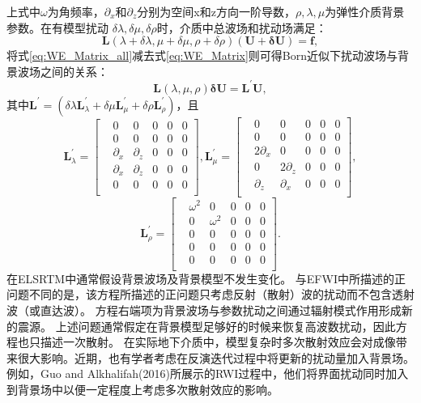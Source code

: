 上式中$\omega$为角频率，$\partial_x$和$\partial_z$分别为空间x和z方向一阶导数，$\rho,\lambda,\mu$为弹性介质背景参数。在有模型扰动
$\delta\lambda,\delta\mu,\delta\rho$时，介质中总波场和扰动场满足：
\begin{equation}
\mathbf{L}(\lambda+\delta\lambda,\mu+\delta\mu,\rho+\delta\rho)(\mathbf{U+\delta U})=\mathbf{f},
    \label{eq:WE_Matrix_all} 
\end{equation}
将式\eqref{eq:WE_Matrix_all}减去式\eqref{eq:WE_Matrix}则可得Born近似下扰动波场与背景波场之间的关系：
\begin{equation}
\mathbf{L}(\lambda,\mu,\rho)\mathbf{\delta U}=\mathbf{L}^{'}\mathbf{U},
    \label{eq:WE_Matrix_delta} 
\end{equation}
其中$\mathbf{L}^{'}=(\delta\lambda\mathbf{L}^{'}_{\lambda}+\delta\mu\mathbf{L}^{'}_{\mu}+\delta\rho\mathbf{L}^{'}_{\rho})$，且
\begin{equation}
        \mathbf{L}^{'}_{\lambda}=
        \begin{bmatrix}
			&0 &0 &0 & 0 &0\\
			& 0  &0 &0 &0 &0\\
			&\partial_x &\partial_z &0 &0&0\\
			& \partial_x  &\partial_z &0 &0&0\\
			& 0  &0&0 &0&0\\
        \end{bmatrix},
        \mathbf{L}^{'}_{\mu}=
        \begin{bmatrix}
            &0 &0 &0 & 0 &0\\
            & 0  &0 &0 &0 &0\\
            &2\partial_x &0 &0 &0&0\\
            & 0  &2\partial_z &0 &0&0\\
            & \partial_z  &\partial_x&0 &0&0\\
        \end{bmatrix},
        \label{eq:L_lambdamu}
\end{equation}
\begin{equation}
        \mathbf{L}^{'}_{\rho}=
        \begin{bmatrix}
		&\omega^2 &0 &0 & 0 &0\\
            & 0  &\omega^2 &0 &0 &0\\
            &0&0 &0 &0&0\\
            &0  &0 &0 &0&0\\
            & 0  &0&0 &0&0\\
        \end{bmatrix}.
        \label{eq:L_rho}
\end{equation}
在ELSRTM中通常假设背景波场及背景模型不发生变化。%
与EFWI中所描述的正问题不同的是，该方程所描述的正问题只考虑反射（散射）波的扰动而不包含透射波（或直达波）。
方程右端项为背景波场与参数扰动之间通过辐射模式作用形成新的震源。
上述问题通常假定在背景模型足够好的时候来恢复高波数扰动，因此方程也只描述一次散射。
在实际地下介质中，模型复杂时多次散射效应会对成像带来很大影响。近期，也有学者考虑在反演迭代过程中将更新的扰动量加入背景场。
例如，Guo and
Alkhalifah(2016)\cite{Guo2016}所展示的RWI过程中，他们将界面扰动同时加入到背景场中以便一定程度上考虑多次散射效应的影响。
